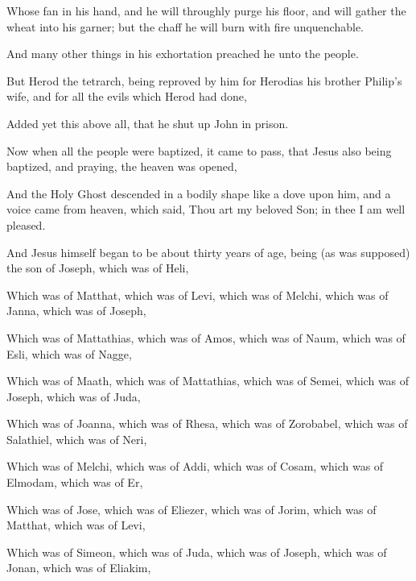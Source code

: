 {Whose
fan
{}
in
his
hand,
and he will throughly
purge
his
floor,
and will
gather the
wheat
into
his
garner;
but the
chaff he will
burn with
fire
unquenchable.

And
many other
things in his
exhortation preached
he unto the
people.

But
Herod the
tetrarch, being
reproved
by
him
for
Herodias
his
brother
Philip’s
wife,
and
for
all the
evils
which
Herod had
done,

Added
yet
this
above
all,
that he shut
up
John
in
prison.

Now
when
all the
people were
baptized, it came to
pass, that
Jesus
also being
baptized,
and
praying, the
heaven was
opened,

And
the
Holy
Ghost
descended in a
bodily
shape
like a
dove
upon
him,
and a
voice
came
from
heaven, which
said,
Thou
art
my
beloved
Son;
in
thee I am well
pleased.

And
Jesus
himself
began to
be
about
thirty years of
age,
being (as was
supposed) the
son of
Joseph, which
was
{} of
Heli,

Which
was
{} of
Matthat, which
was
{} of
Levi, which
was
{} of
Melchi, which
was
{} of
Janna, which
was
{} of
Joseph,

Which
was
{} of
Mattathias, which
was
{} of
Amos, which
was
{} of
Naum, which
was
{} of
Esli, which
was
{} of
Nagge,

Which
was
{} of
Maath, which
was
{} of
Mattathias, which
was
{} of
Semei, which
was
{} of
Joseph, which
was
{} of
Juda,

Which
was
{} of
Joanna, which
was
{} of
Rhesa, which
was
{} of
Zorobabel, which
was
{} of
Salathiel, which
was
{} of
Neri,

Which
was
{} of
Melchi, which
was
{} of
Addi, which
was
{} of
Cosam, which
was
{} of
Elmodam, which
was
{} of
Er,

Which
was
{} of
Jose, which
was
{} of
Eliezer, which
was
{} of
Jorim, which
was
{} of
Matthat, which
was
{} of
Levi,

Which
was
{} of
Simeon, which
was
{} of
Juda, which
was
{} of
Joseph, which
was
{} of
Jonan, which
was
{} of
Eliakim,

}
